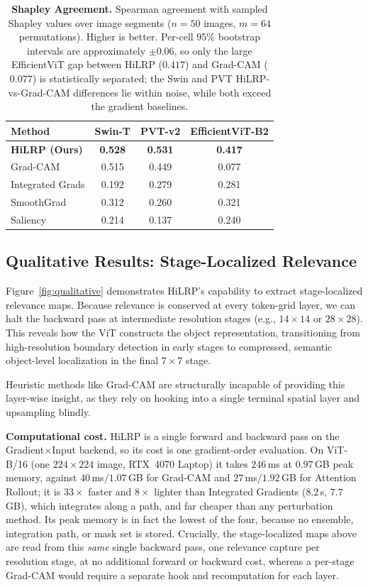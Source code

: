 \documentclass[lettersize,journal]{IEEEtran}
\begin{document}
\begin{table}[h]
  \centering
  \caption{\textbf{Shapley Agreement.} Spearman agreement with sampled Shapley values over image segments ($n{=}50$ images, $m{=}64$ permutations). Higher is better. Per-cell 95\% bootstrap intervals are approximately $\pm0.06$, so only the large EfficientViT gap between HiLRP ($0.417$) and Grad-CAM ($0.077$) is statistically separated; the Swin and PVT HiLRP-vs-Grad-CAM differences lie within noise, while both exceed the gradient baselines.}
  \label{tab:shapley}
  \setlength{\tabcolsep}{5pt}
  \begin{tabular}{l c c c}
    \toprule
    Method & Swin-T & PVT-v2 & EfficientViT-B2 \\
    \midrule
    \textbf{HiLRP (Ours)} & \textbf{0.528} & \textbf{0.531} & \textbf{0.417} \\
    Grad-CAM & 0.515 & 0.449 & 0.077 \\
    Integrated Grads & 0.192 & 0.279 & 0.281 \\
    SmoothGrad & 0.312 & 0.260 & 0.321 \\
    Saliency & 0.214 & 0.137 & 0.240 \\
    \bottomrule
  \end{tabular}
\end{table}

\subsection{Qualitative Results: Stage-Localized Relevance}
\label{sec:qualitative}
Figure~\ref{fig:qualitative} demonstrates HiLRP's capability to extract stage-localized relevance maps. Because relevance is conserved at every token-grid layer, we can halt the backward pass at intermediate resolution stages (e.g., $14 \times 14$ or $28 \times 28$). This reveals how the ViT constructs the object representation, transitioning from high-resolution boundary detection in early stages to compressed, semantic object-level localization in the final $7 \times 7$ stage. 

Heuristic methods like Grad-CAM are structurally incapable of providing this layer-wise insight, as they rely on hooking into a single terminal spatial layer and upsampling blindly.

\noindent\textbf{Computational cost.} HiLRP is a single forward and backward pass on the Gradient$\times$Input backend, so its cost is one gradient-order evaluation. On ViT-B/16 (one $224{\times}224$ image, RTX~4070 Laptop) it takes $246$\,ms at $0.97$\,GB peak memory, against $40$\,ms$/1.07$\,GB for Grad-CAM and $27$\,ms$/1.92$\,GB for Attention Rollout; it is $33\times$ faster and $8\times$ lighter than Integrated Gradients ($8.2$\,s, $7.7$\,GB), which integrates along a path, and far cheaper than any perturbation method. Its peak memory is in fact the lowest of the four, because no ensemble, integration path, or mask set is stored. Crucially, the stage-localized maps above are read from this \emph{same} single backward pass, one relevance capture per resolution stage, at no additional forward or backward cost, whereas a per-stage Grad-CAM would require a separate hook and recomputation for each layer.
\end{document}
